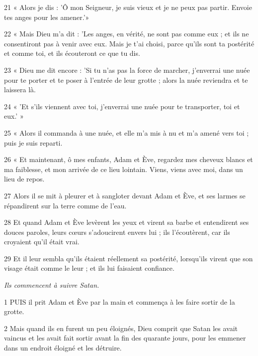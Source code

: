 \par 21 « Alors je dis : 'Ô mon Seigneur, je suis vieux et je ne peux pas partir. Envoie tes anges pour les amener.'»

\par 22 « Mais Dieu m'a dit : 'Les anges, en vérité, ne sont pas comme eux ; et ils ne consentiront pas à venir avec eux. Mais je t'ai choisi, parce qu'ils sont ta postérité et comme toi, et ils écouteront ce que tu dis.

\par 23 « Dieu me dit encore : 'Si tu n'as pas la force de marcher, j'enverrai une nuée pour te porter et te poser à l'entrée de leur grotte ; alors la nuée reviendra et te laissera là.

\par 24 « 'Et s'ils viennent avec toi, j'enverrai une nuée pour te transporter, toi et eux.' »

\par 25 « Alors il commanda à une nuée, et elle m'a mis à nu et m'a amené vers toi ; puis je suis reparti.

\par 26 « Et maintenant, ô mes enfants, Adam et Ève, regardez mes cheveux blancs et ma faiblesse, et mon arrivée de ce lieu lointain. Viens, viens avec moi, dans un lieu de repos.

\par 27 Alors il se mit à pleurer et à sangloter devant Adam et Ève, et ses larmes se répandirent sur la terre comme de l'eau.

\par 28 Et quand Adam et Ève levèrent les yeux et virent sa barbe et entendirent ses douces paroles, leurs cœurs s'adoucirent envers lui ; ils l'écoutèrent, car ils croyaient qu'il était vrai.

\par 29 Et il leur sembla qu'ils étaient réellement sa postérité, lorsqu'ils virent que son visage était comme le leur ; et ils lui faisaient confiance.


\par \textit{Ils commencent à suivre Satan.}

\par 1 PUIS il prit Adam et Ève par la main et commença à les faire sortir de la grotte.

\par 2 Mais quand ils en furent un peu éloignés, Dieu comprit que Satan les avait vaincus et les avait fait sortir avant la fin des quarante jours, pour les emmener dans un endroit éloigné et les détruire.

